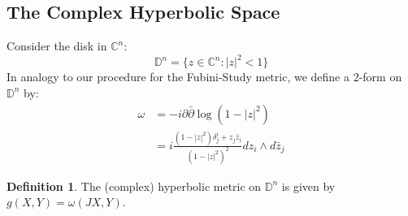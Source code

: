 \documentclass[11pt]{amsart}
\theoremstyle{definition}
\newtheorem{definition}[subsection]{Definition}
\def \C{ \mathbb{C} }
\def \del{ \partial }
\def \delbar{ \bar{\partial} }
\def \disk{ \mathbb{D} }
\begin{document}
\subsection{The Complex Hyperbolic Space}

Consider the disk in $\C^n$:
%
$$ \disk^n = \{ z \in \C^n : |z|^2 < 1 \} $$
%
In analogy to our procedure for the Fubini-Study metric, we define a 2-form on $\disk^n$ by:
%
\begin{align*}
\omega &= - i \del \delbar \log ( 1 - |z|^2 ) \\
&= i \frac{ (1 - |z|^2) \delta^i_j + z_j \bar{z}_i }{ (1 - |z|^2)^2 } d z_i \wedge d \bar{z}_j
\end{align*}

\begin{definition} The (complex) hyperbolic metric on $\disk^n$ is given by $g(X,Y) = \omega(JX,Y)$.
\end{definition}
\end{document}
